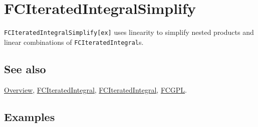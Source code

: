 \documentclass[../FeynCalcManual.tex]{subfiles}
\begin{document}
\begin{Shaded}
\begin{Highlighting}[]
 
\end{Highlighting}
\end{Shaded}

\hypertarget{fciteratedintegralsimplify}{
\section{FCIteratedIntegralSimplify}\label{fciteratedintegralsimplify}}

\texttt{FCIteratedIntegralSimplify[\allowbreak{}ex]} uses linearity to
simplify nested products and linear combinations of
\texttt{FCIteratedIntegral}s.

\subsection{See also}

\hyperlink{toc}{Overview},
\hyperlink{fciteratedintegral}{FCIteratedIntegral},
\hyperlink{fciteratedintegral}{FCIteratedIntegral},
\hyperlink{fcgpl}{FCGPL}.

\subsection{Examples}
\end{document}
